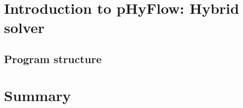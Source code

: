 \section{Introduction to pHyFlow: Hybrid solver}

\subsection{Program structure}

\section{Summary}



%
%
%
%
%
%
%

